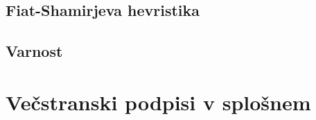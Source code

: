\documentclass[isrm2, tisk]{fmfdelo}
\begin{document}
\subsection{Fiat-Shamirjeva hevristika}
\subsection{Varnost}

\section{Večstranski podpisi v splošnem}

%
%
%
\end{document}

